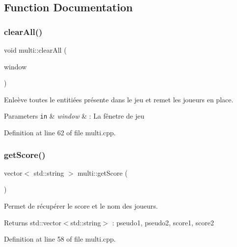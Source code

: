 \subsection{Function Documentation}
\mbox{\label{namespacemulti_aaddb7d8c21297c2b3d2c796964b6f561}} 
\subsubsection{\texorpdfstring{clear\+All()}{clearAll()}}
{\footnotesize\ttfamily void multi\+::clear\+All (\begin{DoxyParamCaption}\item[{\hyperlink{class_min_g_l}{Min\+GL} \&}]{window }\end{DoxyParamCaption})}



Enleève toutes le entitiées présente dans le jeu et remet les joueurs en place. 


\begin{DoxyParams}[1]{Parameters}
\mbox{\tt in}  & {\em window} & \+: La fênetre de jeu \\
\hline
\end{DoxyParams}


Definition at line 62 of file multi.\+cpp.

\mbox{\label{namespacemulti_a673529b0ff995893d952dd68c10b5764}} 
\subsubsection{\texorpdfstring{get\+Score()}{getScore()}}
{\footnotesize\ttfamily vector$<$ std\+::string $>$ multi\+::get\+Score (\begin{DoxyParamCaption}{ }\end{DoxyParamCaption})}



Permet de récupérer le score et le nom des joueurs. 

\begin{DoxyReturn}{Returns}
std\+::vector$<$std\+::string$>$ \+: pseudo1, pseudo2, score1, score2 
\end{DoxyReturn}


Definition at line 58 of file multi.\+cpp.

